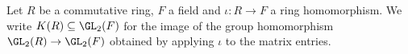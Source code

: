 Let $R$ be a commutative ring, $F$ a field and $\iota\colon R\to F$ a ring homomorphism. We write $K(R)\subseteq\GL_2(F)$
for the image of the group homomorphism $\GL_2(R)\to\GL_2(F)$ obtained by applying $\iota$ to the matrix entries.
